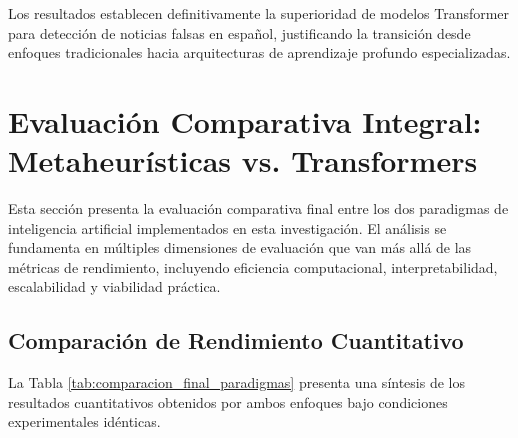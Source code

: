 Los resultados establecen definitivamente la superioridad de modelos Transformer para detección de noticias falsas en español, justificando la transición desde enfoques tradicionales hacia arquitecturas de aprendizaje profundo especializadas.

\section{Evaluación Comparativa Integral: Metaheurísticas vs. Transformers}
\label{sec:evaluacion_comparativa_integral}

Esta sección presenta la evaluación comparativa final entre los dos paradigmas de inteligencia artificial implementados en esta investigación. El análisis se fundamenta en múltiples dimensiones de evaluación que van más allá de las métricas de rendimiento, incluyendo eficiencia computacional, interpretabilidad, escalabilidad y viabilidad práctica.

\subsection{Comparación de Rendimiento Cuantitativo}

La Tabla \ref{tab:comparacion_final_paradigmas} presenta una síntesis de los resultados cuantitativos obtenidos por ambos enfoques bajo condiciones experimentales idénticas.

\begin{table}[htbp]
\centering
{}
\caption{Comparación cuantitativa final entre el mejor algoritmo metaheurístico y el modelo Transformer optimizado.}
\label{tab:comparacion_final_paradigmas}
\end{table}


